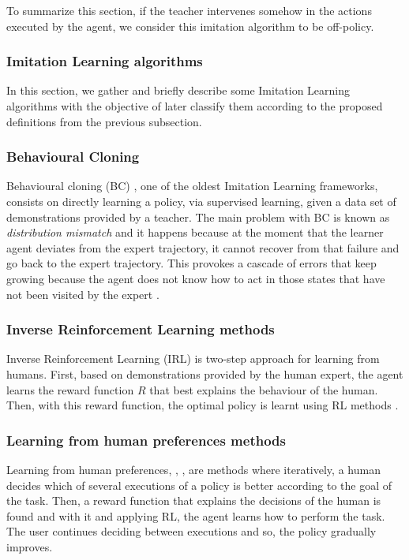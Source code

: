 To summarize this section, if the teacher intervenes somehow in the actions executed by the agent, we consider this imitation algorithm to be off-policy.

\subsubsection{Imitation Learning algorithms}
\label{subsubsection:Imitation Learning algorithms}

In this section, we gather and briefly describe some Imitation Learning algorithms with the objective of later classify them according to the proposed definitions from the previous subsection.




\subsubsection*{Behavioural Cloning}
Behavioural cloning (BC) \cite{Behavioural-Cloning-Pomerleau:1991}, one of the oldest Imitation Learning frameworks, consists on directly learning a policy, via supervised learning, given a data set of demonstrations provided by a teacher. The main problem with BC is known as \textit{distribution mismatch} and it happens because at the moment that the learner agent deviates from the expert trajectory, it cannot recover from that failure and go back to the expert trajectory. This provokes a cascade of errors that keep growing because the agent does not know how to act in those states that have not been visited by the expert \cite{Global-overview-Attia:2018}.

\subsubsection*{Inverse Reinforcement Learning methods}
Inverse Reinforcement Learning (IRL) is two-step approach for learning from humans. First, based on demonstrations provided by the human expert, the agent learns the reward function $R$ that best explains the behaviour of the human. Then, with this reward function, the optimal policy is learnt using RL methods \cite{inverse-reinforcement-learning}.

\subsubsection*{Learning from human preferences methods}
Learning from human preferences, \cite{learning-from-human-preferences:2017}, \cite{learning-from-human-preferences:2018},  are methods where iteratively, a human decides which of several executions of a policy is better according to the goal of the task. Then, a reward function that explains the decisions of the human is found and with it and applying RL, the agent learns how to perform the task. The user continues deciding between executions and so,  the policy gradually improves.


